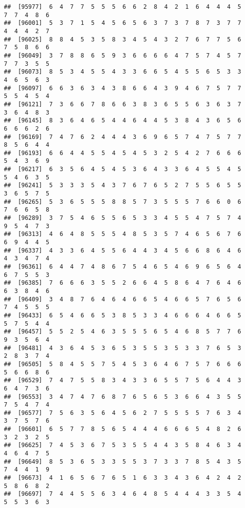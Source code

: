 \documentclass[
]{book}
\begin{document}
\begin{verbatim}
##  [95977]  6  4  7  7  5  5  5  6  6  2  8  4  2  1  6  4  4  4  5  7  7  4  8  6
##  [96001]  5  3  7  1  5  4  5  6  5  6  3  7  3  7  8  7  3  7  7  4  4  4  2  7
##  [96025]  8  8  4  5  3  5  8  3  4  5  4  3  2  7  6  7  7  5  6  7  5  8  6  6
##  [96049]  3  7  8  8  6  5  9  3  6  6  6  6  4  7  5  7  4  5  7  7  7  3  5  5
##  [96073]  8  5  3  4  5  5  4  3  3  6  6  5  4  5  5  6  5  3  3  4  6  5  6  3
##  [96097]  6  6  3  6  3  4  3  8  6  6  4  3  9  4  6  7  5  7  7  5  5  4  5  4
##  [96121]  7  3  6  6  7  8  6  6  3  8  3  6  5  5  6  3  6  3  7  3  6  4  8  3
##  [96145]  8  3  6  4  6  5  4  4  6  4  4  5  3  8  4  3  6  5  6  6  6  6  2  6
##  [96169]  7  4  7  6  2  4  4  4  3  6  9  6  5  7  4  7  5  7  7  8  5  6  4  4
##  [96193]  6  6  4  4  5  5  4  5  4  5  3  2  5  4  2  7  6  6  6  5  4  3  6  9
##  [96217]  6  3  5  6  4  5  4  5  3  6  4  3  3  6  4  5  5  4  5  5  4  6  3  5
##  [96241]  5  3  3  3  5  4  3  7  6  7  6  5  2  7  5  5  6  5  5  3  6  5  7  5
##  [96265]  5  3  6  5  5  5  8  8  5  7  3  5  5  5  7  6  6  0  6  7  6  6  5  8
##  [96289]  3  7  5  4  6  5  5  6  5  3  3  4  5  5  4  7  5  7  4  9  5  4  7  3
##  [96313]  4  6  4  8  5  5  5  4  8  5  3  5  7  4  6  5  6  7  6  6  9  4  4  5
##  [96337]  4  3  3  6  4  5  5  6  4  4  3  4  5  6  6  8  6  4  6  4  3  4  7  4
##  [96361]  6  4  4  7  4  8  6  7  5  4  6  5  4  6  9  6  5  6  4  6  7  5  5  3
##  [96385]  7  6  6  6  3  5  5  2  6  6  4  5  8  6  4  7  6  4  6  6  3  8  4  6
##  [96409]  3  4  8  7  6  4  6  4  6  6  5  4  6  6  5  7  6  5  6  7  4  5  5  5
##  [96433]  6  5  4  6  6  5  3  8  5  3  3  4  6  6  6  4  6  6  5  5  7  5  4  4
##  [96457]  5  5  2  5  4  6  3  5  5  5  6  5  4  6  8  5  7  7  6  9  3  5  6  4
##  [96481]  4  3  6  4  5  3  6  5  3  5  5  3  5  3  3  7  6  5  3  2  8  3  7  4
##  [96505]  5  8  4  5  5  7  5  4  5  3  6  4  6  7  5  7  6  6  6  5  6  6  8  6
##  [96529]  7  4  7  5  5  8  3  4  3  3  6  5  5  7  5  6  4  4  3  6  4  7  3  6
##  [96553]  3  4  7  4  7  6  8  7  6  5  6  5  3  6  6  4  3  5  5  7  5  4  7  4
##  [96577]  7  5  6  3  5  6  4  5  6  2  7  5  5  5  5  7  6  3  4  3  7  5  7  6
##  [96601]  6  5  7  7  8  5  6  5  4  4  4  6  6  6  5  4  8  2  6  3  2  3  2  5
##  [96625]  7  4  5  3  6  7  5  3  5  5  4  4  3  5  8  4  6  3  4  4  6  4  7  5
##  [96649]  8  5  3  6  5  3  3  5  5  3  7  3  3  7  8  5  4  3  5  7  4  4  1  9
##  [96673]  4  1  6  5  6  7  6  5  1  6  3  3  4  3  6  4  2  4  2  5  8  6  8  2
##  [96697]  7  4  4  5  5  6  3  4  6  4  8  5  4  4  4  3  3  5  4  5  5  3  6  3

\end{verbatim}
\end{document}
